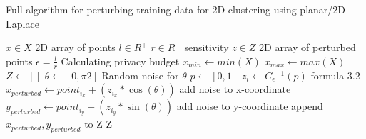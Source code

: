 \begin{algorithm}[H]
  \caption{Full algorithm for perturbing training data for 2D-clustering using planar/2D-Laplace \citep{DBLP:journals/corr/abs-1212-1984}}\label{alg:rq1}
  \begin{algorithmic}
    \Require $x \in X$  \Comment 2D array of points
    \Require $l \in R^ +$
    \Require $r \in R^ +$ \Comment sensitivity
    \Ensure $z \in Z$ \Comment 2D array of perturbed points
    \State $\epsilon = \frac{l}{r}$ \Comment Calculating privacy budget \citep{DBLP:journals/corr/abs-1212-1984}
    \State $x_{min} \gets min(X)$
    \State $x_{max} \gets max(X)$
    \State $Z \gets []$
    \State $\theta \gets [0, \pi2]$       \Comment Random noise for $\theta$
    \State $p \gets [0, 1]$
    \State $z_i \gets C{_\epsilon}{^{-1}}(p)$       \Comment formula 3.2
    \State $x_{perturbed} \gets point_{i_x} + (z_{i_x} * \cos(\theta)) $ \Comment add noise to x-coordinate
    \State $y_{perturbed} \gets point_{i_y} + (z_{i_y} * \sin(\theta)) $ \Comment add noise to y-coordinate
    \State append $x_{perturbed}, y_{perturbed}$ to Z
    \EndFor
    \State \Return Z
  \end{algorithmic}
  \label{alg:2d-laplace}
\end{algorithm}
